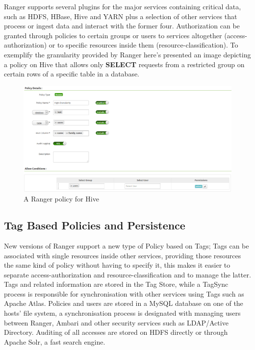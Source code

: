Ranger supports several plugins for the major services containing critical data, such as HDFS, HBase, Hive and YARN plus a selection of other services that process or ingest data and interact with the former four.
\newline Authorization can be granted through policies to certain groups or users to services altogether (access-authorization) or to specific resources inside them (resource-classification).
\newline
To exemplify the granularity provided by Ranger here's presented an image depicting a policy on Hive that allows only \textbf{SELECT} requests from a restricted group on certain rows of a specific table in a database.

\begin{figure}
	\centering
	\includegraphics[scale=0.5]{Figures/policy.png}
	\decoRule
	\caption[Infrastructural Stack]{A Ranger policy for Hive}
	\label{fig:Policy}
\end{figure}

\subsection{Tag Based Policies and Persistence}

New versions of Ranger support a new type of Policy based on Tags; Tags can be associated with single resources inside other services, providing those resources the same kind of policy without having to specify it, this makes it easier to separate access-authorization and resource-classification and to manage the latter.\newline
Tags and related information are stored in the Tag Store, while a TagSync process is responsible for synchronisation with other services using Tags such as Apache Atlas.
\newline
Policies and users are stored in a MySQL database on one of the hosts' file system, a synchronisation process is designated with managing users between Ranger, Ambari and other security services such as LDAP/Active Directory.\newline
Auditing of all accesses are stored on HDFS directly or through Apache Solr, a fast search engine.